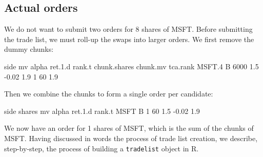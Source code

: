 \documentclass{article}
\begin{document}
\subsection{Actual orders}

We do not want to submit two orders for 8 shares of MSFT.  Before
submitting the trade list, we must roll-up the swaps into larger
orders.  We first remove the dummy chunks:

\begin{Schunk}
\begin{Soutput}
       side   mv alpha ret.1.d rank.t chunk.shares chunk.mv tca.rank
MSFT.4    B 6000   1.5   -0.02    1.9            1       60      1.9
\end{Soutput}
\end{Schunk}

Then we combine the chunks to form a single order per candidate:

\begin{Schunk}
\begin{Soutput}
     side shares mv alpha ret.1.d rank.t
MSFT    B      1 60   1.5   -0.02    1.9
\end{Soutput}
\end{Schunk}

We now have an order for 1 shares of
MSFT, which is the sum of the chunks of
MSFT.  Having discussed in words the process of
trade list creation, we describe, step-by-step, the process of
building a \texttt{tradelist} object in R.






\end{document}
